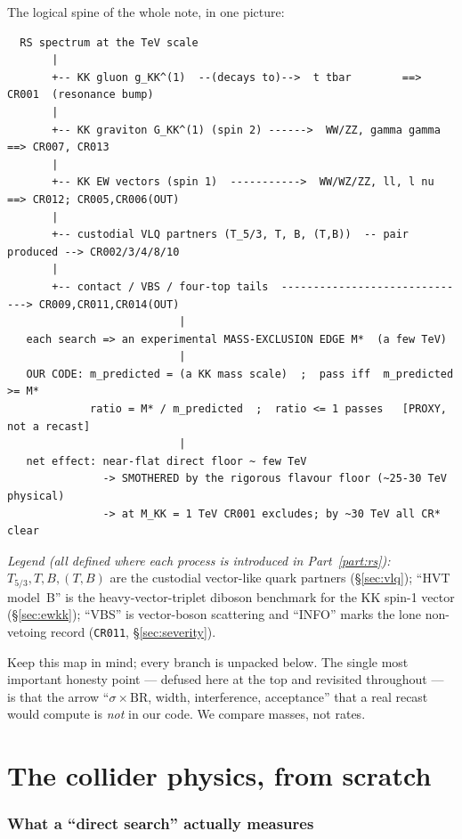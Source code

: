 \documentclass[11pt]{article}
\newcommand{\sBR}{\sigma\!\times\!\mathrm{BR}}
\newcommand{\code}[1]{\texttt{#1}}
\theoremstyle{definition}
\begin{document}
\noindent The logical spine of the whole note, in one picture:
\begin{footnotesize}
\begin{verbatim}
  RS spectrum at the TeV scale
       |
       +-- KK gluon g_KK^(1)  --(decays to)-->  t tbar        ==> CR001  (resonance bump)
       |
       +-- KK graviton G_KK^(1) (spin 2) ------>  WW/ZZ, gamma gamma  ==> CR007, CR013
       |
       +-- KK EW vectors (spin 1)  ----------->  WW/WZ/ZZ, ll, l nu   ==> CR012; CR005,CR006(OUT)
       |
       +-- custodial VLQ partners (T_5/3, T, B, (T,B))  -- pair produced --> CR002/3/4/8/10
       |
       +-- contact / VBS / four-top tails  ------------------------------> CR009,CR011,CR014(OUT)
                           |
   each search => an experimental MASS-EXCLUSION EDGE M*  (a few TeV)
                           |
   OUR CODE: m_predicted = (a KK mass scale)  ;  pass iff  m_predicted >= M*
             ratio = M* / m_predicted  ;  ratio <= 1 passes   [PROXY, not a recast]
                           |
   net effect: near-flat direct floor ~ few TeV
               -> SMOTHERED by the rigorous flavour floor (~25-30 TeV physical)
               -> at M_KK = 1 TeV CR001 excludes; by ~30 TeV all CR* clear
\end{verbatim}
\end{footnotesize}
\noindent\emph{Legend (all defined where each process is introduced in
Part~\ref{part:rs}):} $T_{5/3},T,B,(T,B)$ are the custodial vector-like quark
partners (\S\ref{sec:vlq}); ``HVT model~B'' is the heavy-vector-triplet diboson
benchmark for the KK spin-1 vector (\S\ref{sec:ewkk}); ``VBS'' is vector-boson
scattering and ``INFO'' marks the lone non-vetoing record (\code{CR011},
\S\ref{sec:severity}).

\noindent Keep this map in mind; every branch is unpacked below. The single most
important honesty point --- defused here at the top and revisited throughout ---
is that the arrow ``$\sBR$, width, interference, acceptance'' that a real recast
would compute is \emph{not} in our code. We compare masses, not rates.

\part{The collider physics, from scratch}
\label{part:phys}

\section{What a ``direct search'' actually measures}
\label{sec:directsearch}
\end{document}
